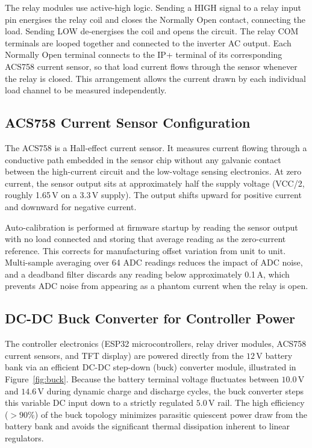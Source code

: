 \documentclass[12pt, a4paper]{report}
\begin{document}
{The relay modules use active-high logic. Sending a HIGH signal to a relay
input pin energises the relay coil and closes the Normally Open contact,
connecting the load. Sending LOW de-energises the coil and opens the circuit.
The relay COM terminals are looped together and connected to the inverter AC
output. Each Normally Open terminal connects to the IP+ terminal of its
corresponding ACS758 current sensor, so that load current flows through the
sensor whenever the relay is closed. This arrangement allows the current drawn
by each individual load channel to be measured independently.

\subsection{ACS758 Current Sensor Configuration}

The ACS758 is a Hall-effect current sensor. It measures current flowing
through a conductive path embedded in the sensor chip without any galvanic
contact between the high-current circuit and the low-voltage sensing
electronics. At zero current, the sensor output sits at approximately half
the supply voltage (VCC/2, roughly 1.65\,V on a 3.3\,V supply). The output
shifts upward for positive current and downward for negative current.

Auto-calibration is performed at firmware startup by reading the sensor output
with no load connected and storing that average reading as the zero-current
reference. This corrects for manufacturing offset variation from unit to unit.
Multi-sample averaging over 64 ADC readings reduces the impact of ADC noise,
and a deadband filter discards any reading below approximately 0.1\,A, which
prevents ADC noise from appearing as a phantom current when the relay is open.

\subsection{DC-DC Buck Converter for Controller Power}

The controller electronics (ESP32 microcontrollers, relay driver modules, ACS758 current sensors, and TFT display) are powered directly from the $12\,\text{V}$ battery bank via an efficient DC-DC step-down (buck) converter module, illustrated in Figure~\ref{fig:buck}. Because the battery terminal voltage fluctuates between $10.0\,\text{V}$ and $14.6\,\text{V}$ during dynamic charge and discharge cycles, the buck converter steps this variable DC input down to a strictly regulated $5.0\,\text{V}$ rail. The high efficiency ($>90\%$) of the buck topology minimizes parasitic quiescent power draw from the battery bank and avoids the significant thermal dissipation inherent to linear regulators.

}
\end{document}
